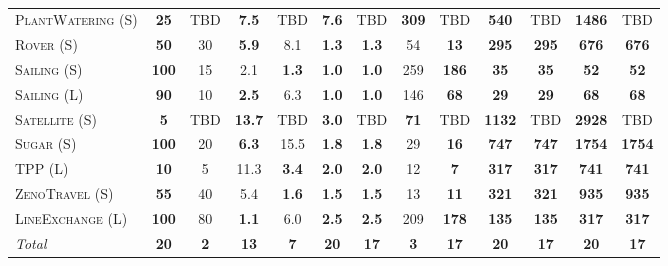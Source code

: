 \documentclass[11pt,landscape]{article}
\begin{document}
\begin{table*}[tb]
{\begin{tabular}{|l||cc||cc||cc||cc||cc||cc||}
\textsc{PlantWatering} (S)&\textbf{25}&TBD&\textbf{7.5}&TBD&\textbf{7.6}&TBD&\textbf{309}&TBD&\textbf{540}&TBD&\textbf{1486}&TBD\\
\textsc{Rover} (S)&\textbf{50}&30&\textbf{5.9}&8.1&\textbf{1.3}&\textbf{1.3}&54&\textbf{13}&\textbf{295}&\textbf{295}&\textbf{676}&\textbf{676}\\
\textsc{Sailing} (S)&\textbf{100}&15&2.1&\textbf{1.3}&\textbf{1.0}&\textbf{1.0}&259&\textbf{186}&\textbf{35}&\textbf{35}&\textbf{52}&\textbf{52}\\
\textsc{Sailing} (L)&\textbf{90}&10&\textbf{2.5}&6.3&\textbf{1.0}&\textbf{1.0}&146&\textbf{68}&\textbf{29}&\textbf{29}&\textbf{68}&\textbf{68}\\
\textsc{Satellite} (S)&\textbf{5}&TBD&\textbf{13.7}&TBD&\textbf{3.0}&TBD&\textbf{71}&TBD&\textbf{1132}&TBD&\textbf{2928}&TBD\\
\textsc{Sugar} (S)&\textbf{100}&20&\textbf{6.3}&15.5&\textbf{1.8}&\textbf{1.8}&29&\textbf{16}&\textbf{747}&\textbf{747}&\textbf{1754}&\textbf{1754}\\
\textsc{TPP} (L)&\textbf{10}&5&11.3&\textbf{3.4}&\textbf{2.0}&\textbf{2.0}&12&\textbf{7}&\textbf{317}&\textbf{317}&\textbf{741}&\textbf{741}\\
\textsc{ZenoTravel} (S)&\textbf{55}&40&5.4&\textbf{1.6}&\textbf{1.5}&\textbf{1.5}&13&\textbf{11}&\textbf{321}&\textbf{321}&\textbf{935}&\textbf{935}\\
\textsc{LineExchange} (L)&\textbf{100}&80&\textbf{1.1}&6.0&\textbf{2.5}&\textbf{2.5}&209&\textbf{178}&\textbf{135}&\textbf{135}&\textbf{317}&\textbf{317}
\\\hline
\textit{Total}&\textbf{20}&\textbf{2}&\textbf{13}&\textbf{7}&\textbf{20}&\textbf{17}&\textbf{3}&\textbf{17}&\textbf{20}&\textbf{17}&\textbf{20}&\textbf{17}\\\hline

        \end{tabular}}
        \caption{}
        \label{tab:experiments}
        \end{table*}
        
\end{document}
